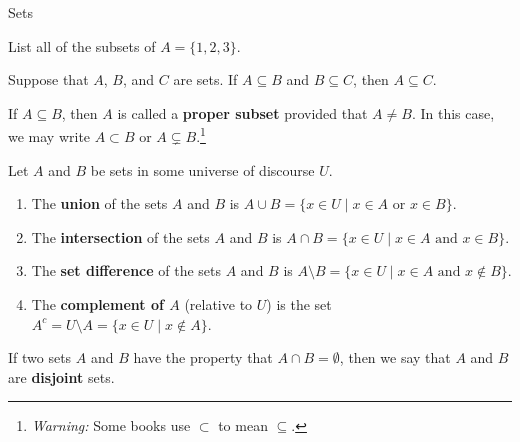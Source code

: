 \begin{section}{Sets}
\begin{problem}
List all of the subsets of $A=\{1,2,3\}$.  %
\end{problem}

\begin{theorem}
Suppose that $A$, $B$, and $C$ are sets.  If $A\subseteq B$ and $B\subseteq C$, then $A\subseteq C$.
\end{theorem}

\begin{definition}
If $A\subseteq B$, then $A$ is called a \textbf{proper subset} provided that $A\neq B$.  In this case, we may write $\boxed{A\subset B}$ or $\boxed{A\subsetneq B}$.\footnote{\emph{Warning:} Some books use $\subset$ to mean $\subseteq$.}
\end{definition}

\begin{definition}
Let $A$ and $B$ be sets in some universe of discourse $U$.
\begin{enumerate}[label=\textrm{(\alph*)}]
\item The \textbf{union} of the sets $A$ and $B$ is $\boxed{A \cup B =\{x\in U \mid x\in A \mbox{ or } x\in B \}}$.
\item The \textbf{intersection} of the sets $A$ and $B$ is $\boxed{A \cap B =\{x\in U \mid x\in A \mbox{ and } x\in B \}}$.
\item The \textbf{set difference} of the sets $A$ and $B$ is $\boxed{A \setminus B =\{x\in U \mid x\in A \mbox{ and } x\notin B \}}$.
\item The \textbf{complement of $A$} (relative to $U$) is the set $\boxed{A^c=U \setminus A =\{x \in U \mid x \notin A\}}$.
\end{enumerate}
\end{definition}

\begin{definition}
If two sets $A$ and $B$ have the property that $A \cap B = \emptyset$, then we say that $A$ and $B$ are \textbf{disjoint} sets.
\end{definition}


\end{section}
